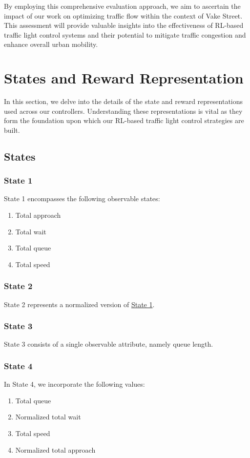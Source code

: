 By employing this comprehensive evaluation approach, we aim to ascertain the impact of our work on optimizing traffic flow within the context of Vake Street. This assessment will provide valuable insights into the effectiveness of RL-based traffic light control systems and their potential to mitigate traffic congestion and enhance overall urban mobility.

\section{States and Reward Representation}
In this section, we delve into the details of the state and reward representations used across our controllers. Understanding these representations is vital as they form the foundation upon which our RL-based traffic light control strategies are built.

\subsection{States}
\subsubsection{State 1} \label{subsec:state-1}
State 1 encompasses the following observable states:

\begin{enumerate}
    \item Total approach
    \item Total wait
    \item Total queue
    \item Total speed
\end{enumerate}

\subsubsection{State 2} \label{subsec:state-2}
State 2 represents a normalized version of \hyperref[subsec:state-1]{State 1}.

\subsubsection{State 3} \label{subsec:state-3}
State 3 consists of a single observable attribute, namely queue length.

\subsubsection{State 4} \label{subsec:state-4}
In State 4, we incorporate the following values:
\begin{enumerate}
    \item Total queue
    \item Normalized total wait
    \item Total speed
    \item Normalized total approach
\end{enumerate}

